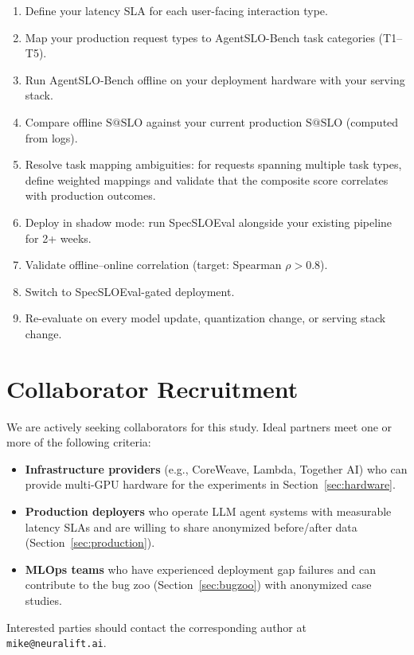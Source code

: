 \documentclass[11pt]{article}
\makeatletter
\newcommand{\sslo}{\ensuremath{\mathrm{S@SLO}}}
\makeatother
\begin{document}
\begin{enumerate}[leftmargin=16pt]
    \item Define your latency SLA for each user-facing interaction type.
    \item Map your production request types to AgentSLO-Bench task categories (T1--T5).
    \item Run AgentSLO-Bench offline on your deployment hardware with your serving stack.
    \item Compare offline $\sslo{}$ against your current production $\sslo{}$ (computed from logs).
    \item Resolve task mapping ambiguities: for requests spanning multiple task types, define weighted mappings and validate that the composite score correlates with production outcomes.
    \item Deploy in shadow mode: run SpecSLOEval alongside your existing pipeline for 2+ weeks.
    \item Validate offline--online correlation (target: Spearman $\rho > 0.8$).
    \item Switch to SpecSLOEval-gated deployment.
    \item Re-evaluate on every model update, quantization change, or serving stack change.
\end{enumerate}

\section{Collaborator Recruitment}
\label{app:collaborators}

We are actively seeking collaborators for this study. Ideal partners meet one or more of the following criteria:

\begin{itemize}[leftmargin=16pt]
    \item \textbf{Infrastructure providers} (e.g., CoreWeave, Lambda, Together AI) who can provide multi-GPU hardware for the experiments in Section~\ref{sec:hardware}.
    \item \textbf{Production deployers} who operate LLM agent systems with measurable latency SLAs and are willing to share anonymized before/after data (Section~\ref{sec:production}).
    \item \textbf{MLOps teams} who have experienced deployment gap failures and can contribute to the bug zoo (Section~\ref{sec:bugzoo}) with anonymized case studies.
\end{itemize}

Interested parties should contact the corresponding author at \texttt{mike@neuralift.ai}.
\end{document}
